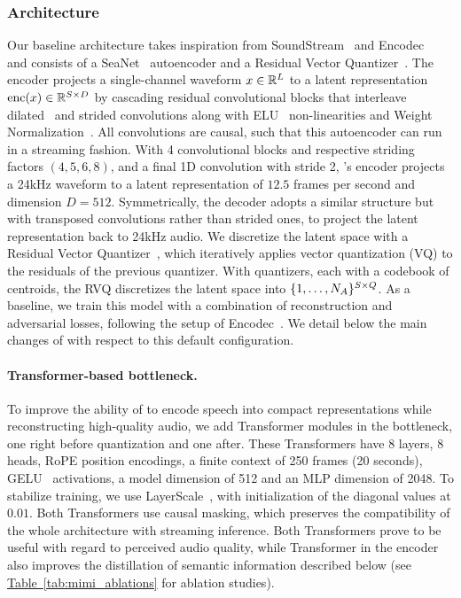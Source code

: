 \subsubsection{Architecture}
Our baseline architecture takes inspiration from SoundStream~\citep{soundstream} and Encodec~\citep{encodec} and consists of a SeaNet~\citep{tagliasacchi2020seanet} autoencoder and a Residual Vector Quantizer~\citep{soundstream}. The encoder projects a single-channel waveform $\waveform \in \mathbb{R}^{\numsamples}$ to a latent representation $\mathrm{enc}(x) \in \mathbb{R}^{S\times D}$ by cascading residual convolutional blocks that interleave dilated~\citep{oord2016wavenet} and strided convolutions along with ELU~\citep{elu} non-linearities and Weight Normalization~\citep{weightnorm}. All convolutions are causal, such that this autoencoder can run in a streaming fashion. With 4 convolutional blocks and respective striding factors $(4, 5, 6, 8)$, and a final 1D convolution with stride 2, \mimi's encoder projects a 24kHz waveform to a latent representation of $12.5$ frames per second and dimension $D = 512$. Symmetrically, the decoder adopts a similar structure but with transposed convolutions rather than strided ones, to project the latent representation back to 24kHz audio. We discretize the latent space with a Residual Vector Quantizer~\citep{soundstream}, which iteratively applies vector quantization (VQ) to the residuals of the previous quantizer. With \numquantizers{} quantizers, each with a codebook of \cardaudio{} centroids, the RVQ discretizes the latent space into $\{1,\dots,\cardaudio\}^{\numtokens\times\numquantizers}$. As a baseline, we train this model with a combination of reconstruction and adversarial losses, following the setup of Encodec~\citep{encodec}. We detail below the main changes of \mimi with respect to this default configuration. %
\paragraph{Transformer-based bottleneck.}
To improve the ability of \mimi to encode speech into compact representations while reconstructing high-quality audio, we add Transformer modules in the bottleneck, one right before quantization and one after. These Transformers have 8 layers, 8 heads, RoPE position encodings, a finite context of 250 frames (20 seconds), GELU~\citep{gelu} activations, a model dimension of 512 and an MLP dimension of 2048. To stabilize training, we use LayerScale~\citep{layerscale}, with initialization of the diagonal values at $0.01$. Both Transformers use causal masking, which preserves the compatibility of the whole architecture with streaming inference. Both Transformers prove to be useful with regard to perceived audio quality, while Transformer in the encoder also improves the distillation of semantic information described below (see \hyperref[tab:mimi_ablations]{Table~\ref{tab:mimi_ablations}} for ablation studies).

